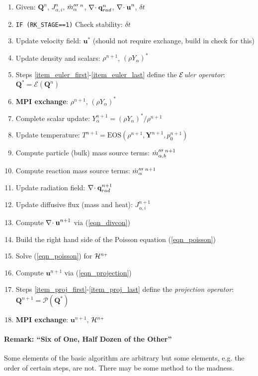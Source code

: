 \documentclass[11pt]{article}
\begin{document}
\begin{enumerate}
\item[] Given: $\mathbf{Q}^n$, $J_{\alpha,i}^n$, $\dot{m}_\alpha^{{\prime\prime\prime} \,\,n}$, $\nabla\!\cdot \mathbf{q}_{rad}^n$, ${\nabla\!\cdot \mathbf{u}}^n$, $\delta t$
\item\label{item_euler_first} {\tt IF (RK\_STAGE==1)} Check stability: $\delta t$
\item Update velocity field: $\mathbf{u}^*$ (should not require exchange, build in check for this)
\item\label{item_euler_last} Update density and scalars: $\rho^{n+1}$, $(\rho Y_\alpha)^*$
\item[] Steps \ref{item_euler_first}-\ref{item_euler_last} define the \emph{${\cal E}$uler operator}: $\mathbf{Q}^{*} = \mathcal{E}(\mathbf{Q}^n)$
\item\label{item_mpi} \textbf{MPI exchange}: $\rho^{n+1}$, $(\rho Y_\alpha)^*$
\item\label{item_proj_first} Complete scalar update: $Y_\alpha^{n+1} = (\rho Y_\alpha)^*/\rho^{n+1}$
\item Update temperature: $T^{n+1} = \mbox{EOS}(\rho^{n+1},\mathbf{Y}^{n+1},p_0^{n+1})$
\item Compute particle (bulk) mass source terms: $\dot{m}_{\alpha,b}^{{\prime\prime\prime}\,\,n+1}$
\item Compute reaction mass source terms: $\dot{m}_\alpha^{{\prime\prime\prime}\,\,n+1}$
\item Update radiation field: $\nabla\!\cdot \mathbf{q}_{rad}^{n+1}$
\item Update diffusive flux (mass and heat): $J_{\alpha,i}^{n+1}$
\item Compute ${\nabla\!\cdot \mathbf{u}}^{n+1}$ via (\ref{eqn_divcon})
\item Build the right hand side of the Poisson equation (\ref{eqn_poisson})
\item Solve (\ref{eqn_poisson}) for ${\cal H}^{n{\scriptscriptstyle +}}$
\item\label{item_proj_last} Compute $\mathbf{u}^{n+1}$ via (\ref{eqn_projection})
\item[] Steps \ref{item_proj_first}-\ref{item_proj_last} define the \emph{projection operator}: $\mathbf{Q}^{n+1} = \mathcal{P}(\mathbf{Q}^*)$
\item \textbf{MPI exchange}: $\mathbf{u}^{n+1}$, ${\cal H}^{n{\scriptscriptstyle +}}$
\end{enumerate}

\paragraph{Remark: ``Six of One, Half Dozen of the Other''} Some elements of the basic algorithm are arbitrary but some elements, e.g. the order of certain steps, are not.  There may be some method to the madness.
\end{document}
